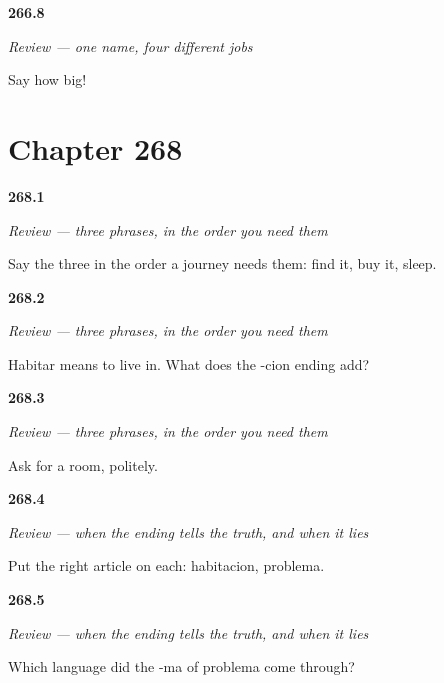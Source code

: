 \noindent\begin{minipage}[t]{\linewidth}
\raggedright
\hypertarget{review-ES-C67-repaso-lo-que-reemplazo-los-casos-que}{\textbf{266.8}} \emph{Review — one name, four different jobs}\par
\small Say how big!
\end{minipage}\par\medskip

\section*{Chapter 268}

\noindent\begin{minipage}[t]{\linewidth}
\raggedright
\hypertarget{review-ES-C268-repaso-llegar-y-quedarse-orden}{\textbf{268.1}} \emph{Review — three phrases, in the order you need them}\par
\small Say the three in the order a journey needs them: find it, buy it, sleep.
\end{minipage}\par\medskip

\noindent\begin{minipage}[t]{\linewidth}
\raggedright
\hypertarget{review-ES-C268-repaso-llegar-y-quedarse-cion}{\textbf{268.2}} \emph{Review — three phrases, in the order you need them}\par
\small Habitar means to live in. What does the -cion ending add?
\end{minipage}\par\medskip

\noindent\begin{minipage}[t]{\linewidth}
\raggedright
\hypertarget{review-ES-C268-repaso-llegar-y-quedarse-room}{\textbf{268.3}} \emph{Review — three phrases, in the order you need them}\par
\small Ask for a room, politely.
\end{minipage}\par\medskip

\noindent\begin{minipage}[t]{\linewidth}
\raggedright
\hypertarget{review-ES-C268-repaso-dos-finales-dos-generos-articles}{\textbf{268.4}} \emph{Review — when the ending tells the truth, and when it lies}\par
\small Put the right article on each: habitacion, problema.
\end{minipage}\par\medskip

\noindent\begin{minipage}[t]{\linewidth}
\raggedright
\hypertarget{review-ES-C268-repaso-dos-finales-dos-generos-why}{\textbf{268.5}} \emph{Review — when the ending tells the truth, and when it lies}\par
\small Which language did the -ma of problema come through?
\end{minipage}\par\medskip

